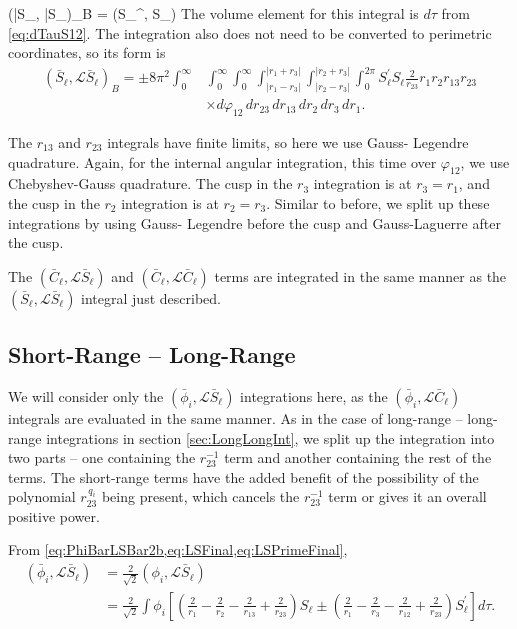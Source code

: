 \documentclass[Dissertation.tex]{subfiles}
\begin{document}
\beq
(\bar{S}_\ell, \bar{S}_\ell)_B = \pm \left(S_\ell^\prime,  S_\ell\right)
\eeq
The volume element for this integral is $d\tau$ from \cref{eq:dTauS12}.
The integration also does not need to be converted to perimetric coordinates,
so its form is
\begin{align}
(\bar{S}_\ell,\mathcal{L} \bar{S}_\ell)_B = \pm 8\pi^2 \int_0^\infty & \int_0^\infty \int_0^\infty \int_{|r_1 - r_3|}^{|r_1 + r_3|} \int_{|r_2 - r_3|}^{|r_2 + r_3|} \int_0^{2\pi}  S_\ell^\prime S_\ell \frac{2}{r_{23}} r_1 r_2 r_{13} r_{23} \nonumber \\
& \times d\varphi_{12}\, dr_{23}\, dr_{13}\, dr_2\, dr_3\, dr_1.
\end{align}

The $r_{13}$ and $r_{23}$ integrals have finite limits, so here we use Gauss-
Legendre quadrature. Again, for the internal angular integration, this time 
over $\varphi_{12}$, we use Chebyshev-Gauss quadrature. The cusp in the $r_3$ 
integration is at $r_3 = r_1$, and the cusp in the $r_2$ integration is at
$r_2 = r_3$. Similar to before, we split up these integrations by using Gauss-
Legendre before the cusp and Gauss-Laguerre after the cusp.

The $(\bar{C}_\ell,\mathcal{L} \bar{S}_\ell)$ and
$(\bar{C}_\ell,\mathcal{L} \bar{C}_\ell)$ terms
are integrated in the same manner as the
$(\bar{S}_\ell,\mathcal{L} \bar{S}_\ell)$ integral just described.


\subsection{Short-Range -- Long-Range}
\label{sec:ShortLongInt}
We will consider only the $(\bar{\phi}_i,\mathcal{L} \bar{S}_\ell)$ integrations here, as the $(\bar{\phi}_i,\mathcal{L} \bar{C}_\ell)$ integrals are evaluated in the same manner. As in the case of long-range -- long-range integrations in section \ref{sec:LongLongInt}, we split up the integration into two parts -- one containing the $r_{23}^{-1}$ term and another containing the rest of the terms. The short-range terms have the added benefit of the possibility of the polynomial $r_{23}^{\,q_i}$ being present, which cancels the $r_{23}^{-1}$ term or gives it an overall positive power.


From \cref{eq:PhiBarLSBar2b,eq:LSFinal,eq:LSPrimeFinal},
\begin{align}
\label{eq:PhiLSBarInt}
\nonumber (\bar{\phi}_i, \mathcal{L} \bar{S}_\ell) &= \frac{2}{\sqrt{2}} \left(\phi_i,\mathcal{L} \bar{S}_\ell\right) \\
 &= \frac{2}{\sqrt{2}} \int \phi_i \left[ \left( \frac{2}{r_1} - \frac{2}{r_2} - \frac{2}{r_{13}} + \frac{2}{r_{23}} \right)S_\ell \pm \left( \frac{2}{r_1} - \frac{2}{r_3} - \frac{2}{r_{12}} + \frac{2}{r_{23}} \right) S_\ell^\prime \right]  d\tau.
\end{align}
\end{document}
